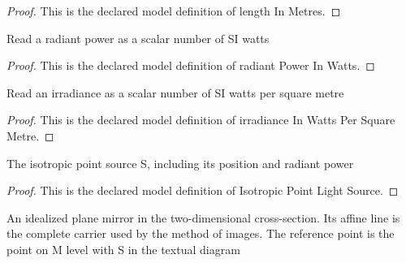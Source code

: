 \begin{proof}
  This is the declared model definition of length In Metres.
\end{proof}
\begin{definition}
  \label{def:physics:phyx-mini-0163:phyxminiproblems-problemphyxmini0163-radiantpowerinwatts}
  Read a radiant power as a scalar number of SI watts
\end{definition}
\begin{proof}
  This is the declared model definition of radiant Power In Watts.
\end{proof}
\begin{definition}
  \label{def:physics:phyx-mini-0163:phyxminiproblems-problemphyxmini0163-irradianceinwattspersquaremetre}
  Read an irradiance as a scalar number of SI watts per square metre
\end{definition}
\begin{proof}
  This is the declared model definition of irradiance In Watts Per Square Metre.
\end{proof}
\begin{definition}
  \label{def:physics:phyx-mini-0163:phyxminiproblems-problemphyxmini0163-isotropicpointlightsource}
  The isotropic point source S, including its position and radiant power
\end{definition}
\begin{proof}
  This is the declared model definition of Isotropic Point Light Source.
\end{proof}
\begin{definition}
  \label{def:physics:phyx-mini-0163:phyxminiproblems-problemphyxmini0163-planemirror}
  An idealized plane mirror in the two-dimensional cross-section. Its affine line is the complete carrier used by the method of images. The reference point is the point on M level with S in the textual diagram
\end{definition}
